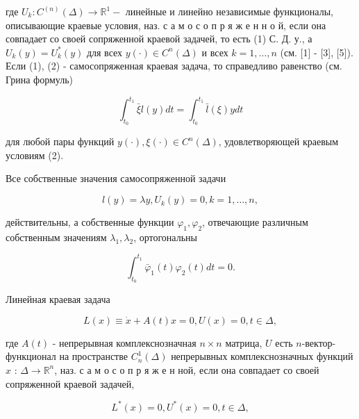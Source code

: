 \documentclass[10pt]{article}
\begin{document}
где $U_{k}: C^{(n)}(\Delta) \rightarrow \mathbb{R}^{1}-$ линейные и линейно независимые функционалы, описывающие краевые условия, наз. с а м о с о п р я ж е н н о й, если она совпадает со своей сопряженной краевой задачей, то есть (1) С. Д. у., а $U_{k}(y)=U_{k}^{*}(y)$ для всех $y(\cdot) \in C^{n}(\Delta)$ и всех $k=1, \ldots, n$ (см. [1] - [3], [5]). Если (1), (2) - самосопряженная краевая задача, то справедливо равенство (см. Грина формуль)



\[

\int_{t_{0}}^{t_{1}} \bar{\xi} l(y) d t=\int_{t_{0}}^{t_{1}} \bar{l}(\xi) y d t

\]



для любой пары функций $y(\cdot), \xi(\cdot) \in C^{n}(\Delta)$, удовлетворяющей краевым условиям (2).



Все собственные значения самосопряженной задачи



\[

l(y)=\lambda y, U_{k}(y)=0, k=1, \ldots, n,

\]



действительны, а собственные функции $\varphi_{1}, \varphi_{2}$, отвечающие различным собственным значениям $\lambda_{1}, \lambda_{2}$, ортогональны



\[

\int_{t_{0}}^{t_{1}} \bar{\varphi}_{1}(t) \varphi_{2}(t) d t=0 .

\]



Линейная краевая задача



\[

L(x) \equiv \dot{x}+A(t) x=0, U(x)=0, t \in \Delta,

\]



где $A(t)$ - непрерывная комплекснозначная $n \times n$ матрица, $U$ есть $n$-вектор-функционал на пространстве $C_{n}^{1}(\Delta)$ непрерывных комплекснозначных функций $x$ : $\Delta \rightarrow \mathbb{R}^{n}$, наз. с а м о с о п р я ж е н ной, если она совпадает со своей сопряженной краевой задачей,



\[

L^{*}(x)=0, U^{*}(x)=0, t \in \Delta,

\]
\end{document}
